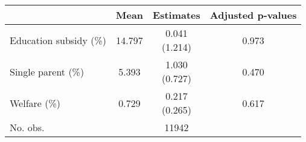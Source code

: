 \begin{tabular}{lccc}
\hline \hline 
 & Mean & Estimates & Adjusted p-values \\
\hline 
Education subsidy (\%) & 14.797 & \makecell[tc]{0.041\\(1.214)} & 0.973 \\
Single parent (\%) & 5.393 & \makecell[tc]{1.030\\(0.727)} & 0.470 \\
Welfare (\%) & 0.729 & \makecell[tc]{0.217\\(0.265)} & 0.617 \\
\hline 
No. obs. &  & 11942 &  \\
\hline \hline
\end{tabular}